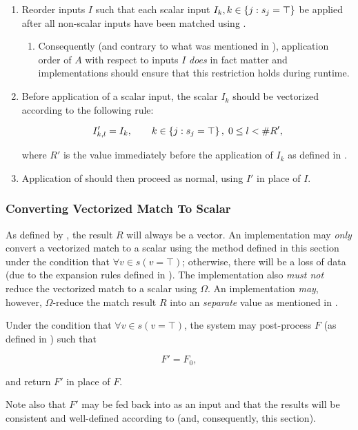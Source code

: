   \begin{enumerate}
    \item
    Reorder inputs $I$ such that each scalar input $I_k, \siset$ be applied
    after all non-scalar inputs have been matched using .
    \begin{enumerate}
      \item
      Consequently (and contrary to what was mentioned in ),
      application order of $A$ with respect to inputs $I$ \emph{does} in fact
      matter and implementations should ensure that this restriction holds
      during runtime.
    \end{enumerate}

    \item
    Before application of a scalar input, the scalar $I_k$ should be vectorized
    according to the following rule:

    $$
      I'_{k,l} = I_k,
      \qquad \siset,
      \; 0 \leq l < \#R',
    $$

    where $R'$ is the value immediately before the application of $I_k$ as
    defined in .

    \item
    Application of  should then proceed as normal, using $I'$ in
    place of $I$.
  \end{enumerate}
\endgroup

\subsubsection{Converting Vectorized Match To Scalar}
As defined by , the result $R$ will always be a vector. An
implementation may \emph{only} convert a vectorized match to a scalar using the
method defined in this section under the condition that $\forall v\in
s(v=\top)$; otherwise, there will be a loss of data (due to the expansion rules
defined in ). The implementation also \emph{must not}
reduce the vectorized match to a scalar using $\Omega$. An implementation
\emph{may}, however, $\Omega$-reduce the match result $R$ into an
\emph{separate} value as mentioned in .

Under the condition that $\forall v\in s(v=\top)$, the system may post-process
$F$ (as defined in ) such that

$$
  F' = F_0,
$$

and return $F'$ in place of $F$.

Note also that $F'$ may be fed back into  as an input and that the
results will be consistent and well-defined according to
 (and, consequently, this section).
